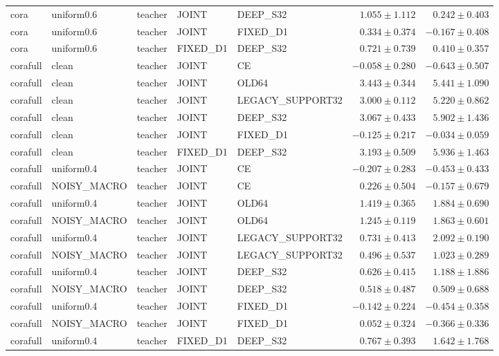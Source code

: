 \begin{longtable}{lllllrr}
cora & uniform0.6 & teacher & JOINT & DEEP\_S32 & $1.055 \pm 1.112$ & $0.242 \pm 0.403$ \\
cora & uniform0.6 & teacher & JOINT & FIXED\_D1 & $0.334 \pm 0.374$ & $-0.167 \pm 0.408$ \\
cora & uniform0.6 & teacher & FIXED\_D1 & DEEP\_S32 & $0.721 \pm 0.739$ & $0.410 \pm 0.357$ \\
corafull & clean & teacher & JOINT & CE & $-0.058 \pm 0.280$ & $-0.643 \pm 0.507$ \\
corafull & clean & teacher & JOINT & OLD64 & $3.443 \pm 0.344$ & $5.441 \pm 1.090$ \\
corafull & clean & teacher & JOINT & LEGACY\_SUPPORT32 & $3.000 \pm 0.112$ & $5.220 \pm 0.862$ \\
corafull & clean & teacher & JOINT & DEEP\_S32 & $3.067 \pm 0.433$ & $5.902 \pm 1.436$ \\
corafull & clean & teacher & JOINT & FIXED\_D1 & $-0.125 \pm 0.217$ & $-0.034 \pm 0.059$ \\
corafull & clean & teacher & FIXED\_D1 & DEEP\_S32 & $3.193 \pm 0.509$ & $5.936 \pm 1.463$ \\
corafull & uniform0.4 & teacher & JOINT & CE & $-0.207 \pm 0.283$ & $-0.453 \pm 0.433$ \\
corafull & NOISY\_MACRO & teacher & JOINT & CE & $0.226 \pm 0.504$ & $-0.157 \pm 0.679$ \\
corafull & uniform0.4 & teacher & JOINT & OLD64 & $1.419 \pm 0.365$ & $1.884 \pm 0.690$ \\
corafull & NOISY\_MACRO & teacher & JOINT & OLD64 & $1.245 \pm 0.119$ & $1.863 \pm 0.601$ \\
corafull & uniform0.4 & teacher & JOINT & LEGACY\_SUPPORT32 & $0.731 \pm 0.413$ & $2.092 \pm 0.190$ \\
corafull & NOISY\_MACRO & teacher & JOINT & LEGACY\_SUPPORT32 & $0.496 \pm 0.537$ & $1.023 \pm 0.289$ \\
corafull & uniform0.4 & teacher & JOINT & DEEP\_S32 & $0.626 \pm 0.415$ & $1.188 \pm 1.886$ \\
corafull & NOISY\_MACRO & teacher & JOINT & DEEP\_S32 & $0.518 \pm 0.487$ & $0.509 \pm 0.688$ \\
corafull & uniform0.4 & teacher & JOINT & FIXED\_D1 & $-0.142 \pm 0.224$ & $-0.454 \pm 0.358$ \\
corafull & NOISY\_MACRO & teacher & JOINT & FIXED\_D1 & $0.052 \pm 0.324$ & $-0.366 \pm 0.336$ \\
corafull & uniform0.4 & teacher & FIXED\_D1 & DEEP\_S32 & $0.767 \pm 0.393$ & $1.642 \pm 1.768$ \\

\end{longtable}

